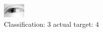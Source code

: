 \begin{figure}[h!]
\begin{center}
\includegraphics[width=0.60\columnwidth]{figures/ID2509_class_3_target_4.png}
\end{center}
\caption{ Classification: 3 actual target: 4}
\label{fig:ID2509_class_3_target_4}
\end{figure}
